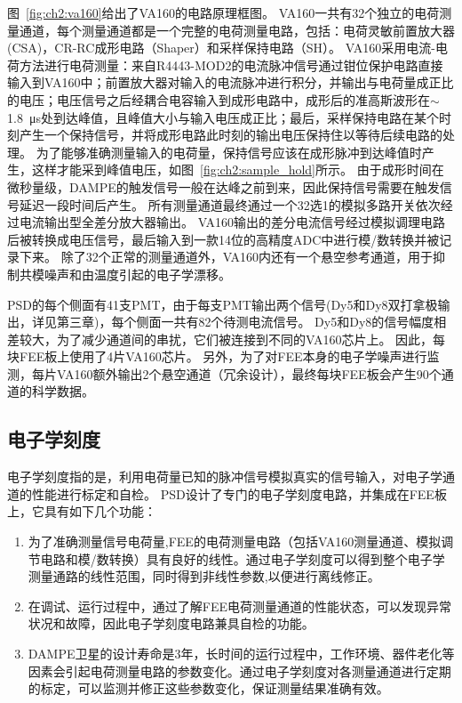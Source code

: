 图~\ref{fig:ch2:va160}给出了VA160的电路原理框图。
VA160一共有32个独立的电荷测量通道，每个测量通道都是一个完整的电荷测量电路，包括：电荷灵敏前置放大器(CSA)，CR-RC成形电路（Shaper）和采样保持电路（SH）。
VA160采用电流-电荷方法进行电荷测量：来自R4443-MOD2的电流脉冲信号通过钳位保护电路直接输入到VA160中；前置放大器对输入的电流脉冲进行积分，并输出与电荷量成正比的电压；电压信号之后经耦合电容输入到成形电路中，成形后的准高斯波形在$\sim$\SI{1.8}{\micro\second}处到达峰值，且峰值大小与输入电压成正比；最后，采样保持电路在某个时刻产生一个保持信号，并将成形电路此时刻的输出电压保持住以等待后续电路的处理。
为了能够准确测量输入的电荷量，保持信号应该在成形脉冲到达峰值时产生，这样才能采到峰值电压，如图~\ref{fig:ch2:sample_hold}所示。
由于成形时间在微秒量级，DAMPE的触发信号一般在达峰之前到来，因此保持信号需要在触发信号延迟一段时间后产生。
所有测量通道最终通过一个32选1的模拟多路开关依次经过电流输出型全差分放大器输出。
VA160输出的差分电流信号经过模拟调理电路后被转换成电压信号，最后输入到一款14位的高精度ADC中进行模/数转换并被记录下来。
除了32个正常的测量通道外，VA160内还有一个悬空参考通道，用于抑制共模噪声和由温度引起的电子学漂移。

PSD的每个侧面有41支PMT，由于每支PMT输出两个信号(Dy5和Dy8双打拿极输出，详见第三章)，每个侧面一共有82个待测电流信号。
Dy5和Dy8的信号幅度相差较大，为了减少通道间的串扰，它们被连接到不同的VA160芯片上。
因此，每块FEE板上使用了4片VA160芯片。
另外，为了对FEE本身的电子学噪声进行监测，每片VA160额外输出2个悬空通道（冗余设计），最终每块FEE板会产生90个通道的科学数据。

\subsection{电子学刻度}
电子学刻度指的是，利用电荷量已知的脉冲信号模拟真实的信号输入，对电子学通道的性能进行标定和自检。
PSD设计了专门的电子学刻度电路，并集成在FEE板上，它具有如下几个功能：
\begin{enumerate}
	\item 为了准确测量信号电荷量,FEE的电荷测量电路（包括VA160测量通道、模拟调节电路和模/数转换）具有良好的线性。通过电子学刻度可以得到整个电子学测量通路的线性范围，同时得到非线性参数,以便进行离线修正。
	\item 在调试、运行过程中，通过了解FEE电荷测量通道的性能状态，可以发现异常状况和故障，因此电子学刻度电路兼具自检的功能。
	\item DAMPE卫星的设计寿命是3年，长时间的运行过程中，工作环境、器件老化等因素会引起电荷测量电路的参数变化。通过电子学刻度对各测量通道进行定期的标定，可以监测并修正这些参数变化，保证测量结果准确有效。
\end{enumerate}

